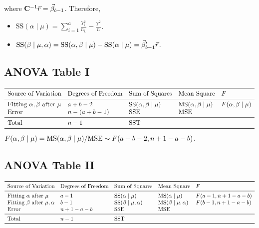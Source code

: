 where $ \mathbf{C}^{-1}\vec{r}=\vec{\beta}_{b-1} $.
Therefore,
\begin{itemize}
    \item $\text{SS}(\alpha\mid \mu)=\sum_{i=1}^{a}\frac{Y_{i.}^2}{n_{i.}}-\frac{Y_{..}^2}{n}$.
    \item $ \text{SS}(\beta\mid \mu,\alpha)=\text{SS}(\alpha,\beta\mid \mu)-\text{SS}(\alpha\mid \mu)=\vec{\beta}_{b-1}'\vec{r} $.
\end{itemize}
\subsection*{ANOVA Table I}
\[ \begin{array}{lllll}
        \toprule
        \text{Source of Variation}                   & \text{Degrees of Freedom} & \text{Sum of Squares}           & \text{Mean Square}              & F                       \\
        \midrule
        \text{Fitting }\alpha,\beta\text{ after }\mu & a+b-2                     & \text{SS}(\alpha,\beta\mid \mu) & \text{MS}(\alpha,\beta\mid \mu) & F(\alpha,\beta\mid \mu) \\
        \text{Error}                                 & n-(a+b-1)                 & \SSE                            & \MSE                                                      \\
        \midrule
        \text{Total}                                 & n-1                       & \SST                                                                                        \\
        \bottomrule
    \end{array} \]
$ F(\alpha,\beta\mid \mu)=\text{MS}(\alpha,\beta\mid \mu)/\text{MSE}\sim F(a+b-2,n+1-a-b) $.
\subsection*{ANOVA Table II}
\[ \begin{array}{lllll}
        \toprule
        \text{Source of Variation}                    & \text{Degrees of Freedom} & \text{Sum of Squares}           & \text{Mean Square}              & F              \\
        \midrule
        \text{Fitting }\alpha\text{ after }\mu        & a-1                       & \text{SS}(\alpha\mid \mu)       & \text{MS}(\alpha\mid \mu)       & F(a-1,n+1-a-b) \\
        \text{Fitting }\beta \text{ after }\mu,\alpha & b-1                       & \text{SS}(\beta\mid \mu,\alpha) & \text{MS}(\beta\mid \mu,\alpha) & F(b-1,n+1-a-b) \\
        \text{Error}                                  & n+1-a-b                   & \SSE                            & \MSE                                             \\
        \midrule
        \text{Total}                                  & n-1                       & \SST                                                                               \\
        \bottomrule
    \end{array} \]
